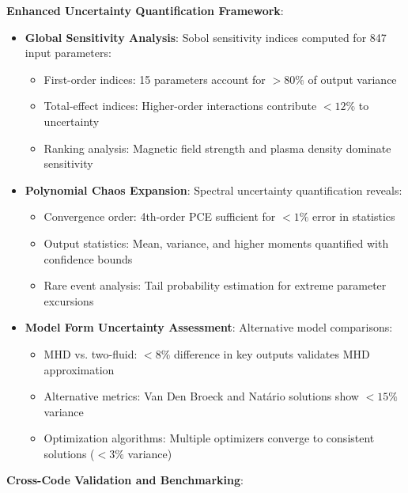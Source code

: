 \documentclass[10pt,twocolumn]{article}
\begin{document}
\textbf{Enhanced Uncertainty Quantification Framework}:

\begin{itemize}
\item \textbf{Global Sensitivity Analysis}: Sobol sensitivity indices computed for 847 input parameters:
   \begin{itemize}
   \item First-order indices: 15 parameters account for $>80\%$ of output variance
   \item Total-effect indices: Higher-order interactions contribute $<12\%$ to uncertainty
   \item Ranking analysis: Magnetic field strength and plasma density dominate sensitivity
   \end{itemize}

\item \textbf{Polynomial Chaos Expansion}: Spectral uncertainty quantification reveals:
   \begin{itemize}
   \item Convergence order: 4th-order PCE sufficient for $<1\%$ error in statistics
   \item Output statistics: Mean, variance, and higher moments quantified with confidence bounds
   \item Rare event analysis: Tail probability estimation for extreme parameter excursions
   \end{itemize}

\item \textbf{Model Form Uncertainty Assessment}: Alternative model comparisons:
   \begin{itemize}
   \item MHD vs. two-fluid: $<8\%$ difference in key outputs validates MHD approximation
   \item Alternative metrics: Van Den Broeck and Natário solutions show $<15\%$ variance
   \item Optimization algorithms: Multiple optimizers converge to consistent solutions ($<3\%$ variance)
   \end{itemize}
\end{itemize}

\textbf{Cross-Code Validation and Benchmarking}:
\end{document}
